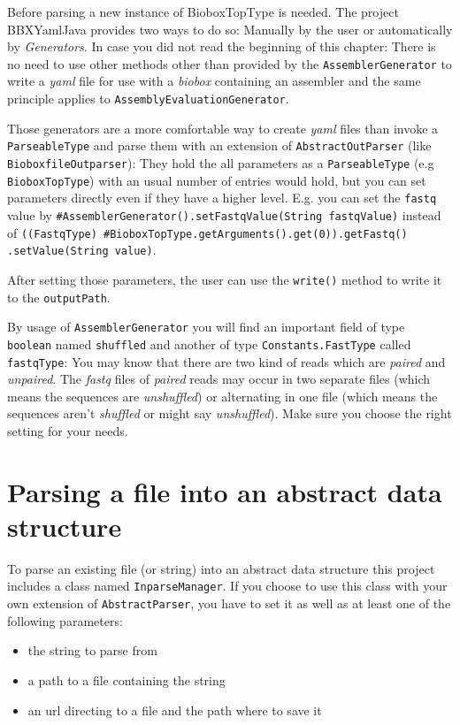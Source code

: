 \documentclass[
	twoside,
	fontsize=12pt,
	headsepline,
	cleardoublepage=empty,
	numbers=noenddot,
	bibliography=totoc,
]{scrbook}
\newcommand{\code}[1]{\texttt{#1}}
\begin{document}
Before parsing a new instance of BioboxTopType is needed. The project BBXYamlJava provides two ways to do so: Manually by the user or automatically by \emph{Generators}. In case you did not read the beginning of this chapter: There is no need to use other methods other than provided by the \code{AssemblerGenerator} to write a \emph{yaml} file for use with a \emph{biobox} containing an assembler and the same principle applies to \code{AssemblyEvaluationGenerator}. 

Those generators are a more comfortable way to create \emph{yaml} files than invoke a \code{ParseableType} and parse them with an extension of \code{AbstractOutParser} (like \code{BioboxfileOutparser}):
They hold the all parameters as a \code{ParseableType} (e.g \code{BioboxTopType}) with an usual number of entries would hold, but you can set parameters directly even if they have a higher level. 
E.g. you can set the \code{fastq} value by  \code{\#AssemblerGenerator().setFastqValue(String fastqValue)} instead of \code{((FastqType) \#BioboxTopType.getArguments().get(0)).getFastq() \\ .setValue(String value)}. 

After setting those parameters, the user can use the \code{write()} method to write it to the \code{outputPath}. 

By usage of \code{AssemblerGenerator} you will find an important field of type \code{boolean} named \code{shuffled} and another of type \code{Constants.FastType} called \code{fastqType}: You may know that there are two kind of reads which are \emph{paired} and \emph{unpaired}. The \emph{fastq} files of \emph{paired} reads may occur in two separate files (which means the sequences are \emph{unshuffled}) or alternating in one file (which means the sequences aren't \emph{shuffled} or might say \emph{unshuffled}). Make sure you choose the right setting for your needs.

\section{Parsing a file into an abstract data structure}
\label{sec:inparse}

To parse an existing file (or string) into an abstract data structure this project includes a class named \code{InparseManager}. If you choose to use this class with your own extension of \code{AbstractParser}, you have to set it as well as at least one of the following parameters: 
\begin{itemize}
	\item the string to parse from
	\item a path to a file containing the string
	\item an url directing to a file and the path where to save it
\end{itemize}
\end{document}
